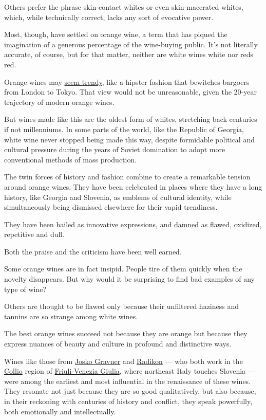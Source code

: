 Others prefer the phrase skin-contact whites or even skin-macerated
whites, which, while technically correct, lacks any sort of evocative
power.

Most, though, have settled on orange wine, a term that has piqued the
imagination of a generous percentage of the wine-buying public. It's not
literally accurate, of course, but for that matter, neither are white
wines white nor reds red.

Orange wines may
\href{https://www.manrepeller.com/2019/07/orange-wine.html}{seem
trendy}, like a hipster fashion that bewitches bargoers from London to
Tokyo. That view would not be unreasonable, given the 20-year trajectory
of modern orange wines.

But wines made like this are the oldest form of whites, stretching back
centuries if not millenniums. In some parts of the world, like the
Republic of Georgia, white wine never stopped being made this way,
despite formidable political and cultural pressure during the years of
Soviet domination to adopt more conventional methods of mass production.

The twin forces of history and fashion combine to create a remarkable
tension around orange wines. They have been celebrated in places where
they have a long history, like Georgia and Slovenia, as emblems of
cultural identity, while simultaneously being dismissed elsewhere for
their vapid trendiness.

They have been hailed as innovative expressions, and
\href{https://www.forbes.com/sites/richardbetts/2013/01/14/tecate-orange-wine/\#25f9b53d765d}{damned}
as flawed, oxidized, repetitive and dull.

Both the praise and the criticism have been well earned.

Some orange wines are in fact insipid. People tire of them quickly when
the novelty disappears. But why would it be surprising to find bad
examples of any type of wine?

Others are thought to be flawed only because their unfiltered haziness
and tannins are so strange among white wines.

The best orange wines succeed not because they are orange but because
they express nuances of beauty and culture in profound and distinctive
ways.

Wines like those from
\href{https://www.nytimes3xbfgragh.onion/2005/05/25/dining/new-wine-in-really-old-bottles.html}{Josko
Gravner} and
\href{https://www.nytimes3xbfgragh.onion/2016/10/05/dining/organic-wine-radikon-italy.html}{Radikon}
--- who both work in the
\href{http://www.movimentoturismovino.it/en/routes/friuli-venezia-giulia/2/the-collio/}{Collio}
region of
\href{https://www.wine-searcher.com/regions-friuli-venezia+giulia}{Friuli-Venezia
Giulia}, where northeast Italy touches Slovenia --- were among the
earliest and most influential in the renaissance of these wines. They
resonate not just because they are so good qualitatively, but also
because, in their reckoning with centuries of history and conflict, they
speak powerfully, both emotionally and intellectually.

